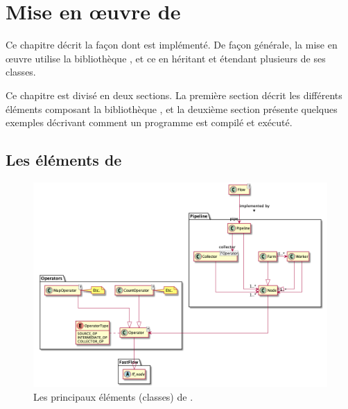 
\chapter{Mise en \oe{}uvre de \PpFf}
\label{implementation.chap}


Ce chapitre décrit la fa\c{c}on dont  est impl\'ement\'e. 
%
De fa\c{c}on g\'en\'erale, la mise en \oe{}uvre utilise la biblioth\`eque , et ce en h\'eritant et \'etendant plusieurs de ses classes.

Ce chapitre est divis\'e en deux sections.
%
La premi\`ere section d\'ecrit les diff\'erents éléments composant la biblioth\`eque , et la deuxi\`eme section pr\'esente quelques exemples d\'ecrivant comment un programme \PpFf{} est compil\'e et ex\'ecut\'e.


\section{Les \'el\'ements de }



\begin{figure}
\centering
         \includegraphics[width=1.0\textwidth]{Figures/vueEnsemble.png}
      \caption{Les principaux éléments (classes) de .}
       \label{All.fig}
\end{figure}

